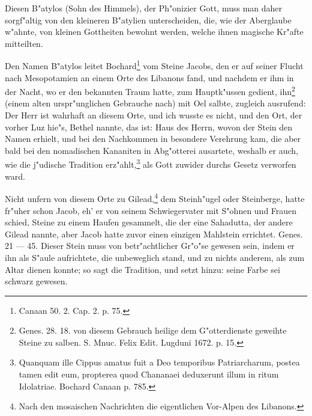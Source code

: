 \documentclass[a4paper, 11pt, oneside, polutonikogreek, german]{article}
\begin{document}
Diesen B"atylos (Sohn des Himmels), der Ph"onizier Gott, muss man daher sorgf"altig von den kleineren B"atylien unterscheiden, die, wie der Aberglaube w"ahnte, von kleinen Gottheiten bewohnt werden, welche ihnen magische Kr"afte mitteilten.

Den Namen B"atylos leitet Bochard\footnote{Canaan 50. 2. Cap. 2. p. 75.} vom Steine Jacobs, den er auf seiner Flucht nach Mesopotamien an einem Orte des Libanons fand, und nachdem er ihm in der Nacht, wo er den bekannten Traum hatte, zum Hauptk"ussen gedient, ihn\footnote{Genes. 28. 18. von diesem Gebrauch heilige dem G"otterdienste geweihte Steine zu salben. S. Mnuc. Felix Edit. Lugduni 1672. p. 15.} (einem alten urspr"unglichen Gebrauche nach) mit Oel salbte, zugleich ausrufend: Der Herr ist wahrhaft an diesem Orte, und ich wusste es nicht, und den Ort, der vorher Luz hie"s, Bethel nannte, das ist: Haus des Herrn, wovon der Stein den Namen erhielt, und bei den Nachkommen in besondere Verehrung kam, die aber bald bei den nomadischen Kananiten in Abg"otterei ausartete, weshalb er auch, wie die j"udische Tradition erz"ahlt,\footnote{Quanquam ille Cippus amatus fuit a Deo temporibus Patriarcharum, postea tamen edit eum, propterea quod Chananaei deduxerunt illum in ritum Idolatriae. Bochard Canaan p. 785.} als Gott zuwider durchs Gesetz verworfen ward.

Nicht unfern von diesem Orte zu Gilead,\footnote{Nach den mosaischen Nachrichten die eigentlichen Vor-Alpen des Libanons.} dem Steinh"ugel oder Steinberge, hatte fr"uher schon Jacob, eh' er von seinem Schwiegervater mit S"ohnen und Frauen schied, Steine zu einem Haufen gesammelt, die der eine Sahadutta, der andere Gilead nannte, aber Jacob hatte zuvor einen einzigen Mahlstein errichtet. Genes. 21 --- 45. Dieser Stein muss von betr"achtlicher Gr"o"se gewesen sein, indem er ihn als S"aule aufrichtete, die unbeweglich stand, und zu nichts anderem, als zum Altar dienen konnte; so sagt die Tradition, und setzt hinzu: seine Farbe sei schwarz gewesen.
\end{document}
